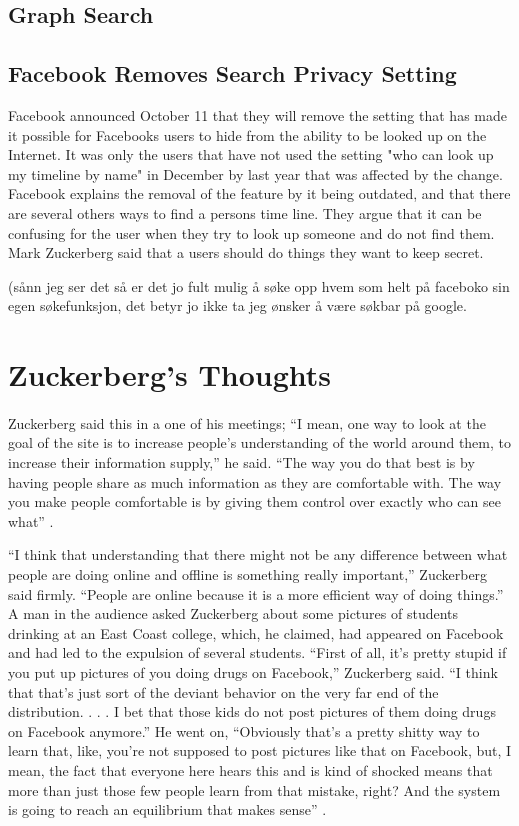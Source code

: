 \subsection{Graph Search}


\subsection{Facebook Removes Search Privacy Setting}
Facebook announced October 11 that they will remove the setting that has made it possible for Facebooks users to hide from the ability to be looked up on the Internet\cite{searchSetting}. It was only the users that have not used the setting "who can look up my timeline by name" in December by last year that was affected by the change. Facebook explains the removal of the feature by it being outdated, and that there are several others ways to find a persons time line. They argue that it can be confusing for the user when they try to look up someone and do not find them. Mark Zuckerberg said that a users should do things they want to keep secret.

(sånn jeg ser det så er det jo fult mulig å søke opp hvem som helt på faceboko sin egen søkefunksjon, det betyr jo ikke ta jeg ønsker å være søkbar på google. 


\section{Zuckerberg's Thoughts}

\paragraph{}
Zuckerberg said this in a one of his meetings; “I mean, one way to look at the goal of the site is to increase people’s understanding of the world around them, to increase their information supply,” he said. “The way you do that best is by having people share as much information as they are comfortable with. The way you make people comfortable is by giving them control over exactly who can see what” \cite{MeMedia}.

“I think that understanding that there might not be any difference between what people are doing online and offline is something really important,” Zuckerberg said firmly. “People are online because it is a more efficient way of doing things.” A man in the audience asked Zuckerberg about some pictures of students drinking at an East Coast college, which, he claimed, had appeared on Facebook and had led to the expulsion of several students. “First of all, it’s pretty stupid if you put up pictures of you doing drugs on Facebook,” Zuckerberg said. “I think that that’s just sort of the deviant behavior on the very far end of the distribution. . . . I bet that those kids do not post pictures of them doing drugs on Facebook anymore.” He went on, “Obviously that’s a pretty shitty way to learn that, like, you’re not supposed to post pictures like that on Facebook, but, I mean, the fact that everyone here hears this and is kind of shocked means that more than just those few people learn from that mistake, right? And the system is going to reach an equilibrium that makes sense” \cite{MeMedia}.

